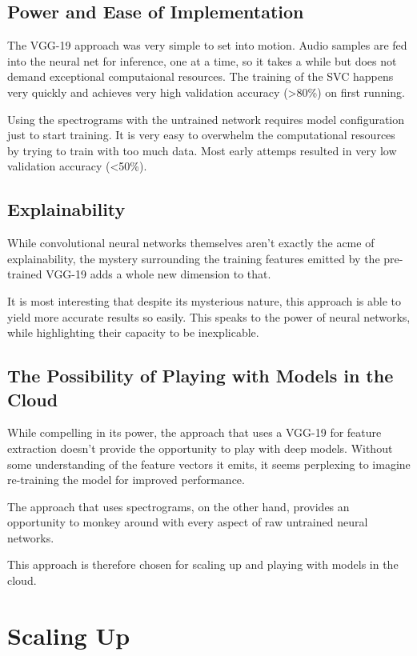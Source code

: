 \documentclass[sigconf]{acmart}
\begin{document}
\subsection{Power and Ease of Implementation}
The VGG-19 approach was very simple to set into motion. Audio
samples are fed into the neural net for inference, one at a time, so
it takes a while but does not demand exceptional computaional resources.
The training of the SVC happens very quickly and achieves very high
validation accuracy (>80\%) on first running.

Using the spectrograms with the untrained network requires model
configuration just to start training. It is very easy to overwhelm the computational
resources by trying to train with too much data. Most early attemps resulted in
very low validation accuracy (<50\%).

\subsection{Explainability} 

While convolutional neural networks themselves aren't exactly the acme
of explainability, the mystery surrounding the training features emitted by
the pre-trained VGG-19 adds a whole new dimension to that.

It is most interesting that despite its mysterious nature, this approach is
able to yield more accurate results so easily. This speaks to the power of 
neural networks, while highlighting their capacity to be inexplicable.

\subsection{The Possibility of Playing with Models in the Cloud}

While compelling in its power, the approach that uses a VGG-19 for
feature extraction doesn't provide the opportunity to play with deep
models. Without some understanding of the feature vectors it emits,
it seems perplexing to imagine re-training the model for improved
performance.

The approach that uses spectrograms, on the other hand, provides
an opportunity to monkey around with every aspect of raw untrained
neural networks.

This approach is therefore chosen for scaling up and playing with models
in the cloud.

\section{Scaling Up}
\end{document}
